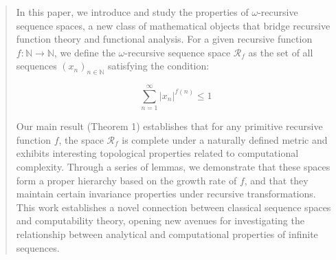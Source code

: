 \begin{abstract}
In this paper, we introduce and study the properties of $\omega$-recursive sequence spaces, a new class of mathematical objects that bridge recursive function theory and functional analysis. For a given recursive function $f: \mathbb{N} \rightarrow \mathbb{N}$, we define the $\omega$-recursive sequence space $\mathcal{R}_f$ as the set of all sequences $(x_n)_{n \in \mathbb{N}}$ satisfying the condition:

\[\sum_{n=1}^{\infty} |x_n|^{f(n)} \leq 1\]

Our main result (Theorem 1) establishes that for any primitive recursive function $f$, the space $\mathcal{R}_f$ is complete under a naturally defined metric and exhibits interesting topological properties related to computational complexity. Through a series of lemmas, we demonstrate that these spaces form a proper hierarchy based on the growth rate of $f$, and that they maintain certain invariance properties under recursive transformations. This work establishes a novel connection between classical sequence spaces and computability theory, opening new avenues for investigating the relationship between analytical and computational properties of infinite sequences.
\end{abstract}